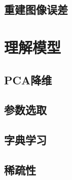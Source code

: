    \subsection{重建图像误差}

\section{理解模型}
    \subsection{PCA降维}
    \subsection{参数选取}
    \subsection{字典学习}
    \subsection{稀疏性}



